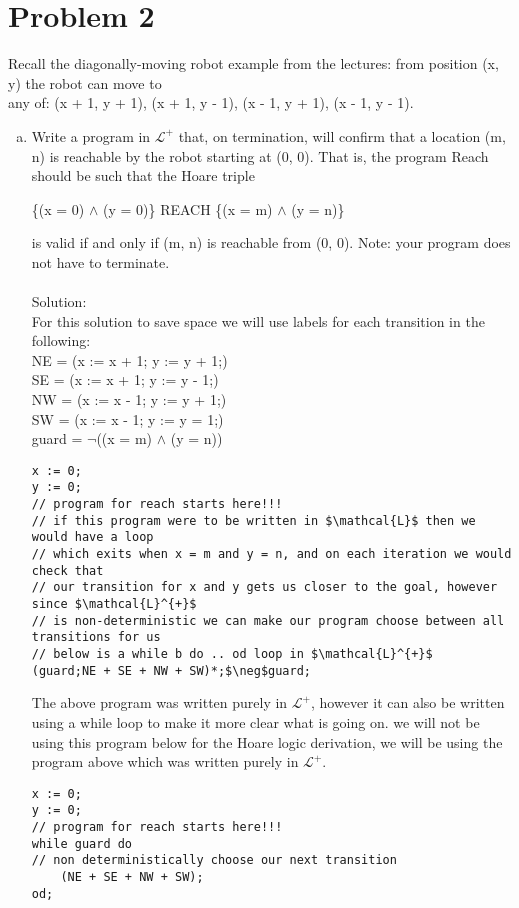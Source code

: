 \documentclass{article}
\newcommand*\moveToRight[1]{\hspace*{0em plus 1fill}\makebox{(#1)}}
\begin{document}
\newpage
\section{Problem 2}
Recall the diagonally-moving robot example from the lectures: from position (x, y) the robot can move to\\
any of: (x + 1, y + 1), (x + 1, y - 1), (x - 1, y + 1), (x - 1, y - 1).
\begin{enumerate}[(a)]
    \item Write a program in $\mathcal{L}^{+}$ that, on termination, will confirm that a location (m, n) is reachable by the robot starting at (0, 0). That is, the program Reach should be such that the Hoare triple
    \begin{center}\{(x = 0) $\land$ (y = 0)\} REACH \{(x = m) $\land$ (y = n)\}\end{center}
    is valid if and only if (m, n) is reachable from (0, 0). Note: your program does not have to terminate.\moveToRight{14 marks}\\\\
    Solution:\\
    For this solution to save space we will use labels for each transition in the following:\\
    NE = (x := x + 1; y := y + 1;)\\
    SE = (x := x + 1; y := y - 1;)\\
    NW = (x := x - 1; y := y + 1;)\\
    SW = (x := x - 1; y := y = 1;)\\
    guard = $\neg$((x = m) $\land$ (y = n))
    \begin{lstlisting}[language=Maple,mathescape=true]
x := 0;
y := 0;
// program for reach starts here!!!
// if this program were to be written in $\mathcal{L}$ then we would have a loop
// which exits when x = m and y = n, and on each iteration we would check that 
// our transition for x and y gets us closer to the goal, however since $\mathcal{L}^{+}$
// is non-deterministic we can make our program choose between all transitions for us
// below is a while b do .. od loop in $\mathcal{L}^{+}$
(guard;NE + SE + NW + SW)*;$\neg$guard;
    \end{lstlisting}    
The above program was written purely in $\mathcal{L}^{+}$, however it can also be written using a while loop to make it more clear what is going on. we will not be using this program below for the Hoare logic derivation, we will be using the program above which was written purely in $\mathcal{L}^{+}$.
    \begin{lstlisting}[language=Maple,mathescape=true]
x := 0;
y := 0;
// program for reach starts here!!!
while guard do
// non deterministically choose our next transition
    (NE + SE + NW + SW);
od;
    \end{lstlisting}   
    

\end{enumerate}
\end{document}
